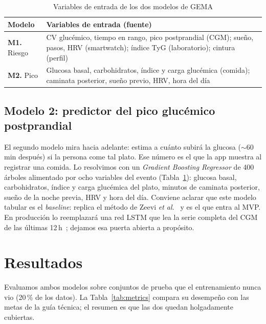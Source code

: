 \documentclass[9pt,letterpaper,twocolumn]{extarticle}
\begin{document}
\begin{table}[t]
\caption{Variables de entrada de los dos modelos de GEMA}
\label{tab:vars}
\centering
\footnotesize
\begin{tabularx}{\columnwidth}{@{}lX@{}}
\toprule
\textbf{Modelo} & \textbf{Variables de entrada (fuente)} \\
\midrule
\textbf{M1.} Riesgo & CV glucémico, tiempo en rango, pico postprandial
(CGM); sueño, pasos, HRV (smartwatch); índice TyG (laboratorio); cintura
(perfil) \\[2pt]
\textbf{M2.} Pico & Glucosa basal, carbohidratos, índice y carga glucémica
(comida); caminata posterior, sueño previo, HRV, hora del día \\
\bottomrule
\end{tabularx}
\end{table}

\subsection{Modelo 2: predictor del pico glucémico postprandial}
El segundo modelo mira hacia adelante: estima a cuánto subirá la glucosa
($\sim$60\,min después) si la persona come tal plato. Ese número es el que la app
muestra al registrar una comida. Lo resolvimos con un \emph{Gradient Boosting
Regressor} de 400 árboles alimentado por ocho variables del evento
(Tabla~\ref{tab:vars}): glucosa basal, carbohidratos, índice y carga glucémica
del plato, minutos de caminata posterior, sueño de la noche previa, HRV y hora
del día. Conviene aclarar que este modelo tabular es el \emph{baseline}: replica
el método de Zeevi \textit{et al.}~\cite{zeevi} y es el que entra al MVP. En
producción lo reemplazará una red LSTM que lea la serie completa del CGM de las
últimas 12\,h~\cite{oviedo}; dejamos esa puerta abierta a propósito.

\section{Resultados}\label{sec:res}
Evaluamos ambos modelos sobre conjuntos de prueba que el entrenamiento nunca vio
(20\,\% de los datos). La Tabla~\ref{tab:metrics} compara su desempeño con las
metas de la guía técnica; el resumen es que las dos quedan holgadamente cubiertas.
\end{document}
